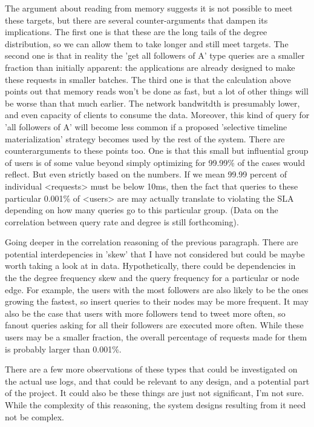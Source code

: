 \documentclass{article}
\begin{document}
 The argument about reading from memory suggests it is not possible to meet these targets, but there are several counter-arguments that dampen its implications. The first one is that these are the long tails of the degree distribution, so we can allow them to take longer and still meet targets.  The second one is that in reality the 'get all followers of A'  type queries are a smaller fraction than initially apparent: the applications are already designed to make these requests in smaller batches. The third one is that the calculation above points out that memory reads won't be done as fast, but a lot of other things will be worse than that much earlier. The network bandwitdth is presumably lower, and  even capacity of clients to consume the data. Moreover, this kind of query for 'all followers of A' will become less common if a proposed 'selective timeline materialization' strategy becomes used by the rest of the system. There are counterarguments to these points too. One is that this small but influential group of users is of some value beyond simply optimizing for 99.99\% of the cases would reflect. But even strictly based on the numbers. If we mean 99.99 percent of individual <requests> must be below 10ms, then the fact that queries to these particular 0.001\% of <users> are may actually translate to violating the SLA depending on how many queries go to this particular group. (Data on the correlation between query rate and degree is still forthcoming).

Going deeper in the correlation reasoning of the previous paragraph. There are potential interdepencies in 'skew' that I have not considered but could be maybe worth taking a look at in data. Hypothetically, there could be dependencies in the the degree frequency skew and the query frequency for a particular or node edge. For example, the users with the most followers are also likely to be the ones growing the fastest, so insert queries to their nodes may be more frequent. It may also be the case that users with more followers tend to tweet more often, so fanout queries asking for all their followers are executed more often. While these users may be a smaller fraction, the overall percentage of requests made for them is probably larger than 0.001\%.  

There are a few more observations of these types that could be investigated on the actual use logs, and that could be relevant to any design, and a potential part of the project. It could also be these things are just not significant, I'm not sure. While the complexity of this reasoning, the system designs resulting from it need not be complex.
\end{document}

